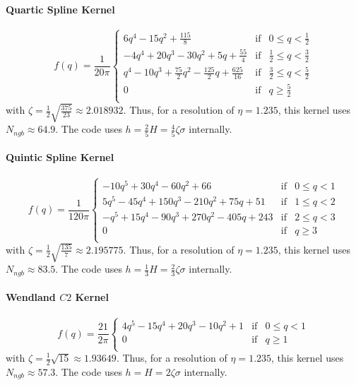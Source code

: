 \documentclass[a4paper,10pt]{article}
\begin{document}
\paragraph{Quartic Spline Kernel}
\begin{equation*}
 f(q) = \frac{1}{20\pi}\left\lbrace \begin{array}{rcl}
                      6q^4 - 15q^2 + \frac{115}{8} & \mbox{if} & 0 \leq q < \frac{1}{2} \\
		      -4q^4 + 20q^3-30q^2 + 5q + \frac{55}{4} & \mbox{if} & \frac{1}{2} \leq q < \frac{3}{2} \\
		      q^4-10q^3+\frac{75}{2}q^2-\frac{125}{2}q+\frac{625}{16} & \mbox{if} & \frac{3}{2} \leq q < 
\frac{5}{2} \\
		      0 & \mbox{if} & q \geq \frac{5}{2} \\
                     \end{array}\right.
\end{equation*}
with $\zeta = \frac{1}{2}\sqrt{\frac{375}{23}} \approx 2.018932$. Thus, for a resolution of $\eta = 1.235$, this kernel 
uses $N_{ngb} \approx 64.9$. The code uses $h = \frac{2}{5}H =\frac{4}{5}\zeta \sigma$ internally.

\paragraph{Quintic Spline Kernel}
\begin{equation*}
 f(q) = \frac{1}{120\pi}\left\lbrace \begin{array}{rcl}
                      -10q^5 + 30q^4 - 60q^2 + 66 & \mbox{if} & 0 \leq q < 1 \\
		      5q^5 - 45q^4 + 150q^3 - 210q^2 + 75q + 51 & \mbox{if} & 1 \leq q < 2 \\
		      -q^5 + 15q^4 - 90q^3 + 270q^2 - 405q + 243 & \mbox{if} & 2 \leq q < 3 \\
		      0 & \mbox{if} & q \geq 3 \\
                     \end{array}\right.
\end{equation*}
with $\zeta = \frac{1}{2}\sqrt{\frac{135}{7}} \approx 2.195775$. Thus, for a resolution of $\eta = 1.235$, this kernel 
uses $N_{ngb} \approx 83.5$. The code uses $h = \frac{1}{3}H = \frac{2}{3}\zeta \sigma$ internally.

\paragraph{Wendland $C2$ Kernel}
\begin{equation*}
 f(q) = \frac{21}{2\pi}\left\lbrace \begin{array}{rcl}
                      4 q^5-15 q^4+20 q^3-10 q^2+1 & \mbox{if} & 0 \leq q < 1 \\
		      0 & \mbox{if} & q \geq 1 \\
                     \end{array}\right.
\end{equation*}
 with $\zeta = \frac{1}{2}\sqrt{15} \approx 1.93649$. Thus, for a resolution of $\eta = 1.235$, this kernel 
uses $N_{ngb} \approx 57.3$. The code uses $h = H = 2\zeta \sigma$ internally.
\end{document}
